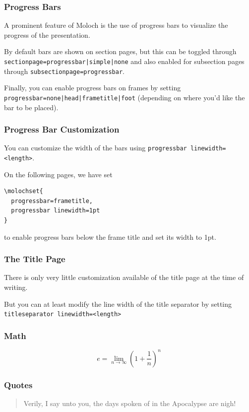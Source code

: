 \documentclass[10pt]{beamer}
\begin{document}
\begin{frame}[c]
  \frametitle{Progress Bars}

  A prominent feature of Moloch is the use of progress bars to
  visualize the progress of the presentation. \medskip

  By default bars are shown on section pages, but this can be toggled
  through \texttt{sectionpage=progressbar|simple|none} and also enabled for
  subsection pages through \texttt{subsectionpage=progressbar}.\medskip

  Finally, you can enable progress bars on frames by setting
  \texttt{progressbar=none|head|frametitle|foot} (depending on where
  you'd like the bar to be placed).\medskip
\end{frame}

\begin{frame}[c,fragile]
  \frametitle{Progress Bar Customization}
  You can customize the width of the bars using
  \texttt{progressbar linewidth=<length>}.\medskip

  On the following pages, we have set
  \begin{verbatim}\molochset{
  progressbar=frametitle,
  progressbar linewidth=1pt
}
    \end{verbatim}
    to enable progress bars below the frame title and set its width to 1pt.
  \end{frame}


  \begin{frame}[c,fragile]
    \frametitle{The Title Page}

    There is only very little customization available of the title page at the
    time of writing.\medskip

    But you can at least modify the line width of the title separator
    by setting \texttt{titleseparator linewidth=<length>}
  \end{frame}

  \begin{frame}
    \frametitle{Math}
    \begin{equation*}
      e = \lim_{n\to \infty} \left(1 + \frac{1}{n}\right)^n
    \end{equation*}
  \end{frame}

  \begin{frame}
    \frametitle{Quotes}
    \begin{quote}
      Verily, I say unto you, the days spoken of in the Apocalypse are nigh!
    \end{quote}
  \end{frame}
\end{document}

